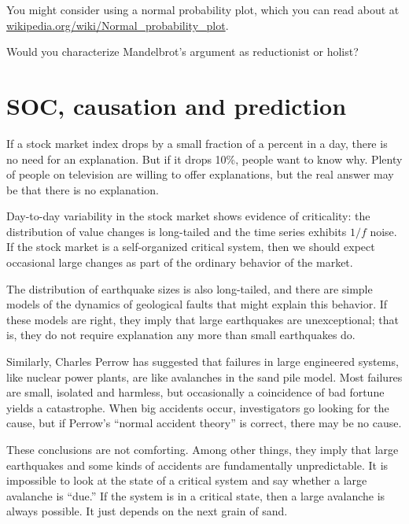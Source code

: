 \documentclass[10pt]{book}
\begin{document}
\begin{ex}
\begin{enumerate}
  You might consider using a normal probability plot, which you
  can read about at \url{wikipedia.org/wiki/Normal_probability_plot}.
  

\end{enumerate}

Would you characterize Mandelbrot's argument as reductionist
or holist?

\end{ex}


\section{SOC, causation and prediction}

If a stock market index drops by a small fraction of a percent in a
day, there is no need for an explanation.  But if it drops 10\%,
people want to know why.  Plenty of people
on television are willing to offer explanations, but the real
answer may be that there is no explanation.

Day-to-day variability in the stock market shows evidence of
criticality: the distribution of value changes is long-tailed
and the time series exhibits $1/f$ noise.
If the stock market is a self-organized critical system, then we
should expect occasional large changes as part of the ordinary
behavior of the market.

The distribution of earthquake sizes is also long-tailed,
and there are simple models of the dynamics of geological faults
that might explain this behavior.  If these models are right,
they imply that large earthquakes are unexceptional; that is,
they do not require explanation any more than
small earthquakes do.

Similarly, Charles Perrow has suggested that failures in large
engineered systems, like nuclear power plants, are like avalanches
in the sand pile model.  Most failures are small, isolated and
harmless, but occasionally a coincidence of bad fortune yields a
catastrophe.  When big accidents occur, investigators go looking for
the cause, but if Perrow's ``normal accident theory'' is correct,
there may be no cause.

These conclusions are not comforting.  Among other things, they
imply that large earthquakes and some kinds of accidents are
fundamentally unpredictable.  It is impossible to look at the
state of a critical system and say whether a large avalanche
is ``due.''  If the system is in a critical state, then a large
avalanche is always possible.  It just depends on the
next grain of sand.
\end{document}
